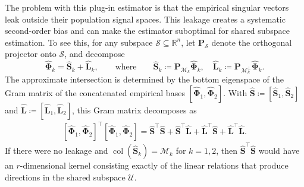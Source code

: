 \documentclass[11pt]{article}
\newcommand{\trans}{\top}
\newcommand{\cU}{\mathcal{U}}
\newcommand{\cM}{\mathcal{M}}
\begin{document}
The problem with this plug-in estimator is that the empirical singular
vectors leak outside their population signal spaces. This leakage creates a
systematic second-order bias and can make the estimator suboptimal for shared
subspace estimation. To see this, for any subspace
$\mathcal S\subseteq\mathbb R^n$, let $\bm P_{\mathcal S}$ denote the
orthogonal projector onto $\mathcal S$, and decompose
\[
  \widehat{\bm\Phi}_k=\widehat{\bm S}_k+\widehat{\bm L}_k,
  \qquad \text{where}\qquad
  \widehat{\bm S}_k\coloneqq\bm P_{\cM_k}\widehat{\bm\Phi}_k,
  \quad
  \widehat{\bm L}_k\coloneqq\bm P_{\cM_k^\perp}\widehat{\bm\Phi}_k.
\] 
The approximate intersection is determined by the bottom eigenspace of the
Gram matrix of the concatenated empirical bases
$[\widehat{\bm\Phi}_1,\widehat{\bm\Phi}_2]$. With
$\widehat{\bm S}\coloneqq[\widehat{\bm S}_1,\widehat{\bm S}_2]$ and
$\widehat{\bm L}\coloneqq[\widehat{\bm L}_1,\widehat{\bm L}_2]$, this Gram
matrix decomposes as
\begin{equation}
\label{eq:intro-ajive-gram}
\begin{aligned}
  [\widehat{\bm\Phi}_1,\widehat{\bm\Phi}_2]^\trans
  [\widehat{\bm\Phi}_1,\widehat{\bm\Phi}_2]
  =
  \widehat{\bm S}^\trans\widehat{\bm S}
  +
  \widehat{\bm S}^\trans\widehat{\bm L}
  +
  \widehat{\bm L}^\trans\widehat{\bm S}
  +
  \widehat{\bm L}^\trans\widehat{\bm L}.
\end{aligned}
\end{equation}
If there were no leakage and
$\operatorname{col}(\widehat{\bm S}_k)=\cM_k$ for $k=1,2$, then
$\widehat{\bm S}^\trans\widehat{\bm S}$ would have an $r$-dimensional
kernel consisting exactly of the linear relations that produce directions
in the shared subspace $\cU$.
\end{document}
